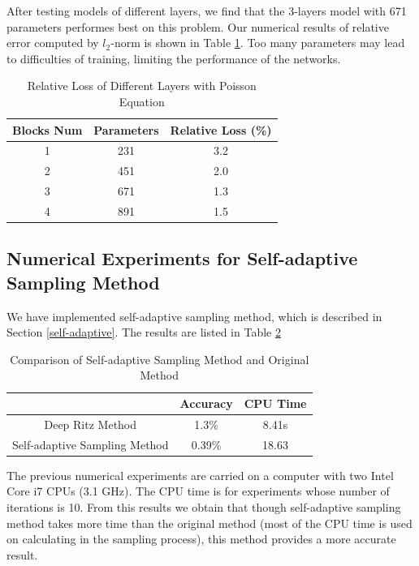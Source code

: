 \documentclass{article}
\begin{document}
\par After testing models of different layers, we find that the 3-layers model with 671 parameters performes best on this problem. Our numerical results of relative error computed by $l_2$-norm is shown in Table \ref{different layers of poisson equation}. Too many parameters may lead to difficulties of training, limiting the performance of the networks.

\begin{table}
\centering  
\caption{Relative Loss of Different Layers with Poisson Equation}
\label{different layers of poisson equation}
\begin{tabular}{ccc} 
	\toprule  %
	Blocks Num & Parameters & Relative Loss (\%) \\
	\hline
	1 & 231 & 3.2\\
	\hline
	2 & 451 & 2.0\\
	\hline
	3 & 671 & 1.3\\
	\hline
	4 & 891 & 1.5\\
	\bottomrule %
\end{tabular}
\end{table}

\subsection{Numerical Experiments for Self-adaptive Sampling Method}
\par We have implemented self-adaptive sampling method, which is described in Section \ref{self-adaptive}. The results are listed in Table \ref{adaptive experiments}
\begin{table}
	\centering
	\caption{Comparison of Self-adaptive Sampling Method and Original Method}
	\label{adaptive experiments}
	\begin{tabular}{ccc}
		\toprule
		& Accuracy & CPU Time\\
		\hline
		Deep Ritz Method & 1.3\% & 8.41s\\
		\hline
		Self-adaptive Sampling Method & 0.39\% & 18.63\\
		\bottomrule
	\end{tabular}
\end{table}
\par The previous numerical experiments are carried on a computer with two Intel Core i7 CPUs (3.1 GHz). The CPU time is for experiments whose number of iterations is 10. From this results we obtain that though self-adaptive sampling method takes more time than the original method (most of the CPU time is used on calculating in the sampling process), this method provides a more accurate result. 
\end{document}
